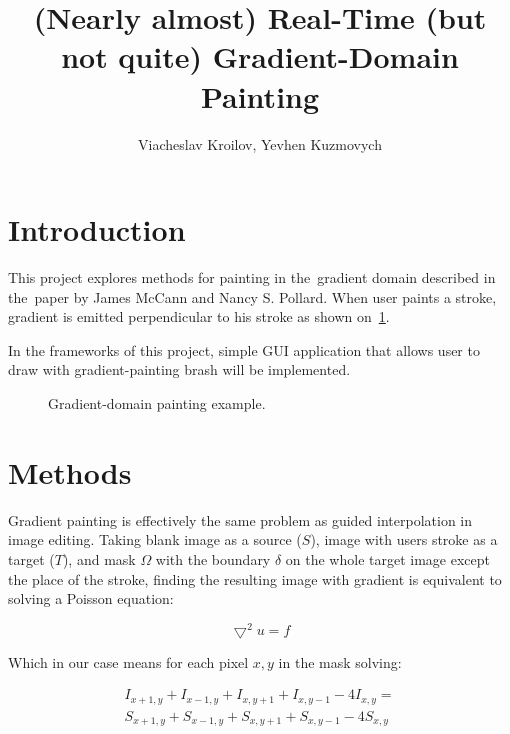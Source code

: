 \documentclass[hidelinks, english]{report}
\title{(Nearly almost) Real-Time (but not quite) Gradient-Domain Painting}
\author{Viacheslav Kroilov, Yevhen Kuzmovych}
\affiliation{ČVUT - FIT}
\newcommand{\subimage}[3][1]{
\subfigure{
\texttt{[image: \#2.\#3]}
}
}
\begin{document}
    \maketitle

    \section{Introduction}

    This project explores methods for painting in the~gradient domain described in the~paper by James McCann and
    Nancy S. Pollard\cite{gradient}. When user paints a stroke, gradient is emitted perpendicular to his stroke as
    shown on~\cref{fig:example}.

    In the frameworks of this project, simple GUI application that allows user to draw with gradient-painting brash will
    be implemented.

    \begin{figure}[h]
        \subimage[0.21]{target}{png}
        \subimage[0.21]{result}{png}
        \caption{Gradient-domain painting example.}
        \label{fig:example}
    \end{figure}


    \section{Methods}
    Gradient painting is effectively the same problem as guided interpolation in image editing. Taking blank image as a
    source ($S$), image with users stroke as a target ($T$), and mask $\Omega$ with the boundary $\delta$ on the whole
    target image except the place of the stroke, finding the resulting image with gradient is equivalent to solving
    a Poisson equation:

    \begin{equation}
        \bigtriangledown^2 u = f
    \end{equation}

    Which in our case means for each pixel $x,y$ in the mask solving:

    \begin{equation}
        \begin{multlined}
            I_{x+1,y} + I_{x-1,y} + I_{x,y+1} + I_{x,y-1} - 4I_{x,y} = \\
            S_{x+1,y} + S_{x-1,y} + S_{x,y+1} + S_{x,y-1} - 4S_{x,y}
        \end{multlined}
        \label{eq:poisson}
    \end{equation}
\end{document}
